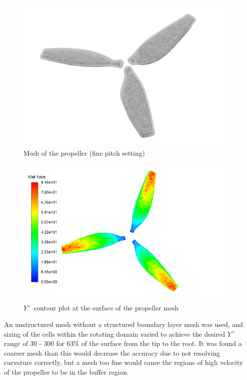 \begin{figure}[!htbp]
    \centering
    \includegraphics{images/part10.1/propmesh-removebg-preview.png}
    \caption{Mesh of the propeller (fine pitch setting)}
    \label{fig:propellermesh}
\end{figure}

\begin{figure}[!htbp]
    \centering
    \includegraphics{images/part10.1/Yplus_refined_mesh-removebg-preview_integrated.png}
    \caption{$Y^+$ contour plot at the surface of the propeller mesh}
    \label{fig:propelleryplus}
\end{figure}

An unstructured mesh without a structured boundary layer mesh was used, and sizing of the cells within the rotating domain varied to achieve the desired $Y^+$ range of 30 - 300 for 63\% of the surface from the tip to the root. It was found a coarser mesh than this would decrease the accuracy due to not resolving curvature correctly, but a mesh too fine would cause the regions of high velocity of the propeller to be in the buffer region.
